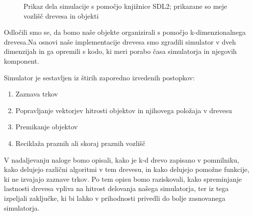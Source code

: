 \documentclass[a4paper,12pt]{article}
\begin{document}
\begin{figure}
    \centering
    \caption{Prikaz dela simulacije s pomočjo knjižnice SDL2; prikazane so meje vozlišč drevesa in objekti}
\end{figure}



Odločili smo se, da bomo naše objekte organizirali s pomočjo k-dimenzionalnega drevesa.\@ Na osnovi naše implementacije drevesa
smo zgradili simulator v dveh dimenzijah in ga opremili s kodo, ki meri porabo časa simulatorja in njegovih
komponent.

Simulator je sestavljen iz štirih zaporedno izvedenih postopkov:
\begin{enumerate}
    \item Zaznava trkov
    \item Popravljanje vektorjev hitrosti objektov in njihovega položaja v drevesu
    \item Premikanje objektov
    \item Reciklaža praznih ali skoraj praznih vozlišč
\end{enumerate}

V nadaljevanju naloge bomo opisali, kako je k-d drevo zapisano v pomnilniku, kako delujejo različni
algoritmi v tem drevesu, in kako delujejo pomožne funkcije, ki ne izvajajo zaznave trkov. Po tem opisu
bomo raziskovali, kako spreminjanje lastnosti drevesa vpliva na hitrost delovanja našega simulatorja,
ter iz tega izpeljali zaključke, ki bi lahko v prihodnosti privedli do bolje zasnovanega simulatorja.
\end{document}
